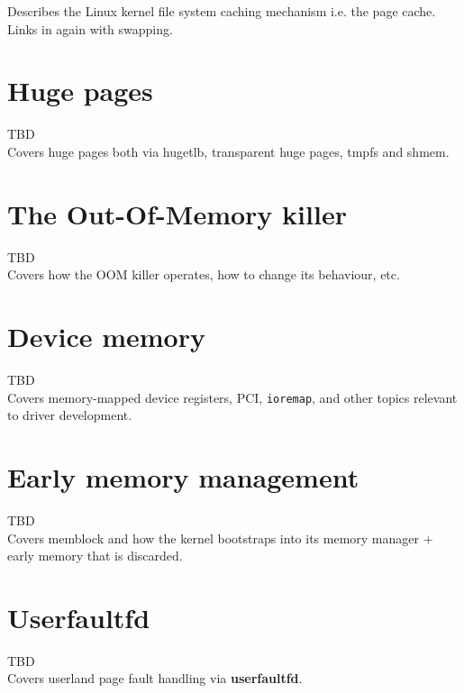 \documentclass[a4paper,oneside]{scrbook}
\begin{document}
Describes the Linux kernel file system caching mechanism i.e. the page
cache. Links in again with swapping.\\

\chapter{Huge pages}

TBD\\

Covers huge pages both via hugetlb, transparent huge pages, tmpfs and shmem.\\

\chapter{The Out-Of-Memory killer}

TBD\\

Covers how the OOM killer operates, how to change its behaviour, etc.\\

\chapter{Device memory}

TBD\\

Covers memory-mapped device registers, PCI, \texttt{ioremap}, and other
topics relevant to driver development.\\

\chapter{Early memory management}

TBD\\

Covers memblock and how the kernel bootstraps into its memory manager + early
memory that is discarded.\\

\chapter{Userfaultfd}

TBD\\

Covers userland page fault handling via \textbf{userfaultfd}.\\

\backmatter
\printindex
\end{document}
